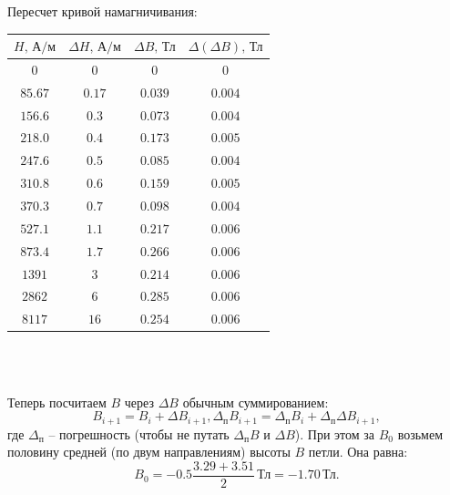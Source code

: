 Пересчет кривой намагничивания:
\begin{center}
\begin{tabular}{|c|c|c|c|}\hline
$H\text{, А/м}$&$\Delta H\text{, А/м}$&$\Delta B\text{, Тл}$&$\Delta (\Delta B)\text{, Тл}$\\\hline
$0$&$0$&$0$&$0$\\\hline
$85.67$&$0.17$&$0.039$&$0.004$\\\hline
$156.6$&$0.3$&$0.073$&$0.004$\\\hline
$218.0$&$0.4$&$0.173$&$0.005$\\\hline
$247.6$&$0.5$&$0.085$&$0.004$\\\hline
$310.8$&$0.6$&$0.159$&$0.005$\\\hline
$370.3$&$0.7$&$0.098$&$0.004$\\\hline
$527.1$&$1.1$&$0.217$&$0.006$\\\hline
$873.4$&$1.7$&$0.266$&$0.006$\\\hline
$1391$&$3$&$0.214$&$0.006$\\\hline
$2862$&$6$&$0.285$&$0.006$\\\hline
$8117$&$16$&$0.254$&$0.006$\\\hline
\end{tabular}\\~\\
\end{center}
Теперь посчитаем $B$ через $\Delta B$ обычным суммированием:
$$B_{i+1} = B_{i} + \Delta B_{i+1}, \Delta_\text{п} B_{i+1} = \Delta_\text{п} B_{i} + \Delta_\text{п} \Delta B_{i+1},$$
где $\Delta_\text{п}$ -- погрешность (чтобы не путать $\Delta_\text{п} B$ и $\Delta B$).
При этом за $B_0$ возьмем половину средней (по двум направлениям) высоты $B$ петли. Она равна:
$$B_0 = -0.5 \frac{3.29 + 3.51}{2}\,\text{Тл} = -1.70\,\text{Тл}.$$

